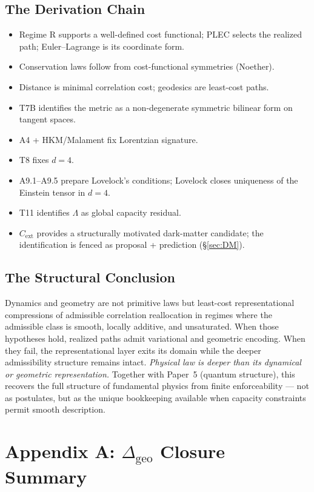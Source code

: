 \documentclass[11pt]{article}
\begin{document}
\subsection{The Derivation Chain}
\begin{itemize}[leftmargin=1.5em,nosep]
    \item Regime R supports a well-defined cost functional; PLEC selects the
    realized path; Euler--Lagrange is its coordinate form.
    \item Conservation laws follow from cost-functional symmetries (Noether).
    \item Distance is minimal correlation cost; geodesics are least-cost paths.
    \item T7B identifies the metric as a non-degenerate symmetric bilinear form
    on tangent spaces.
    \item A4 + HKM/Malament fix Lorentzian signature.
    \item T8 fixes $d = 4$.
    \item A9.1--A9.5 prepare Lovelock's conditions; Lovelock closes uniqueness
    of the Einstein tensor in $d=4$.
    \item T11 identifies $\Lambda$ as global capacity residual.
    \item $C_{\mathrm{ext}}$ provides a structurally motivated dark-matter
    candidate; the identification is fenced as proposal + prediction (\S\ref{sec:DM}).
\end{itemize}

\subsection{The Structural Conclusion}
Dynamics and geometry are not primitive laws but least-cost representational
compressions of admissible correlation reallocation in regimes where the
admissible class is smooth, locally additive, and unsaturated. When those
hypotheses hold, realized paths admit variational and geometric encoding. When
they fail, the representational layer exits its domain while the deeper
admissibility structure remains intact. \emph{Physical law is deeper than its
dynamical or geometric representation.} Together with Paper~5 (quantum
structure), this recovers the full structure of fundamental physics from finite
enforceability --- not as postulates, but as the unique bookkeeping available
when capacity constraints permit smooth description.

\appendix

\section*{Appendix A: $\Delta_{\mathrm{geo}}$ Closure Summary}
\end{document}
